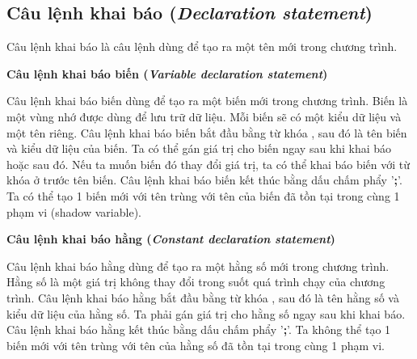 \subsection{Câu lệnh khai báo (\textit{Declaration statement})}

\regexdeclstmt

Câu lệnh khai báo là câu lệnh dùng để tạo ra một tên mới trong chương trình. 

\noindent\textbf{Câu lệnh khai báo biến (\textit{Variable declaration statement})}

\regexvardeclstmt

Câu lệnh khai báo biến dùng để tạo ra một biến mới trong chương trình. Biến là một vùng nhớ được dùng để lưu trữ dữ liệu. Mỗi biến sẽ có một kiểu dữ liệu và một tên riêng. Câu lệnh khai báo biến bắt đầu bằng từ khóa , sau đó là tên biến và kiểu dữ liệu của biến. Ta có thể gán giá trị cho biến ngay sau khi khai báo hoặc sau đó. Nếu ta muốn biến đó thay đổi giá trị, ta có thể khai báo biến với từ khóa  ở trước tên biến. Câu lệnh khai báo biến kết thúc bằng dấu chấm phẩy '\textbf{;}'. Ta có thể tạo 1 biến mới với tên trùng với tên của biến đã tồn tại trong cùng 1 phạm vi (shadow variable).

\noindent\textbf{Câu lệnh khai báo hằng (\textit{Constant declaration statement})}

\regexconstdeclstmt

Câu lệnh khai báo hằng dùng để tạo ra một hằng số mới trong chương trình. Hằng số là một giá trị không thay đổi trong suốt quá trình chạy của chương trình. Câu lệnh khai báo hằng bắt đầu bằng từ khóa , sau đó là tên hằng số và kiểu dữ liệu của hằng số. Ta phải gán giá trị cho hằng số ngay sau khi khai báo. Câu lệnh khai báo hằng kết thúc bằng dấu chấm phẩy '\textbf{;}'. Ta không thể tạo 1 biến mới với tên trùng với tên của hằng số đã tồn tại trong cùng 1 phạm vi.
